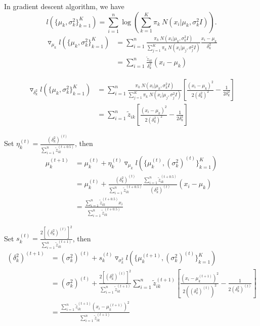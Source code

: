 \documentclass{article}
\theoremstyle{definition}
\theoremstyle{definition}
\theoremstyle{remark}
\begin{document}
In gradient descent algorithm, we have
\[
l\left(\{\mu_k,\sigma_k^2\}_{k=1}^K\right) = \sum_{i=1}^n\log\left(\sum_{k=1}^K\pi_k~N(x_i|\mu_k,\sigma_k^2I)\right).
\]
\begin{equation}\nonumber
\begin{aligned}
\triangledown_{\mu_k}l\left(\{\mu_k,\sigma_k^2\}_{k=1}^K\right) &= \sum_{i=1}^n \frac{\pi_k~N(x_i|\mu_k,\sigma_k^2I)}{\sum_{j=1}^K\pi_k~N(x_i|\mu_j,\sigma_j^2I)}\frac{x_i-\mu_k}{\delta_k^2}\\
&= \sum_{i=1}^n  \frac{\tilde{z}_{ik}}{\delta_k^2}(x_i-\mu_k)
\end{aligned}
\end{equation}

\begin{equation}\nonumber
\begin{aligned}
\triangledown_{\delta_k^2}l\left(\{\mu_k,\sigma_k^2\}_{k=1}^K\right)
&= \sum_{i=1}^n \frac{\pi_k~N(x_i|\mu_k,\sigma_k^2I)}{\sum_{j=1}^K\pi_k~N(x_i|\mu_j,\sigma_j^2I)}[\frac{(x_i-\mu_k)^2}{2(\delta_k^2)^2}-\frac{1}{2\delta_k^2}]
\\
&= \sum_{i=1}^n \tilde{z}_{ik}[\frac{(x_i-\mu_k)^2}{2(\delta_k^2)^2}-\frac{1}{2\delta_k^2}]
\end{aligned}
\end{equation}

Set $\eta_k^{(t)}=\frac{(\delta_k^2)^{(t)}}{\sum_{i=1}^n \tilde{z}_{ik}^{(t+0.5)}}$, then
\begin{equation}\nonumber
\begin{aligned}
\mu_k^{(t+1)}&=\mu_k^{(t)}+\eta_k^{(t)}\triangledown_{\mu_k}l\left(\{\mu_k^{(t)},(\sigma_k ^2)^{(t)}\}_{k=1}^K\right)\\
&=\mu_k^{(t)}+\frac{(\delta_k^2)^{(t)}}{\sum_{i=1}^n \tilde{z}_{ik}^{(t+0.5)}} \frac{\sum_{i=1}^n\tilde{z}_{ik}^{(t+0.5)}}{(\delta_k^2)^{(t)}}(x_i-\mu_k)\\
&=\frac{\sum_{i=1}^n \tilde{z}_{ik}^{(t+0.5)}x_i}{\sum_{i=1}^n \tilde{z}_{ik}^{(t+0.5)}}
\end{aligned}
\end{equation}

Set $s_k^{(t)}=\frac{2[(\delta_k^2)^{(t)}]^2}{\sum_{i=1}^n \tilde{z}_{ik}^{(t+1)}}$, then
\begin{equation}\nonumber
\begin{aligned}
(\delta_k^2)^{(t+1)} &= (\sigma_k ^2)^{(t)}+s_k^{(t)}\triangledown_{\sigma_k^2}l\left(\{\mu_k^{(t+1)},(\sigma_k ^2)^{(t)}\}_{k=1}^K\right) \\
&= (\sigma_k ^2)^{(t)}+\frac{2[(\delta_k^2)^{(t)}]^2}{\sum_{i=1}^n \tilde{z}_{ik}^{(t+1)}}\sum_{i=1}^n \tilde{z}_{ik}^{(t+1)}[\frac{(x_i-\mu_k^{(t+1)})^2}{2((\delta_k^2)^{(t)})^2}-\frac{1}{2(\delta_k^2)^{(t)}}]\\
&= \frac{\sum_{i=1}^n \tilde{z}_{ik}^{(t+1)}(x_i-\mu_k^{(t+1)})^2}{\sum_{i=1}^n \tilde{z}_{ik}^{(t+1)}}
\end{aligned}
\end{equation}
\end{document}
